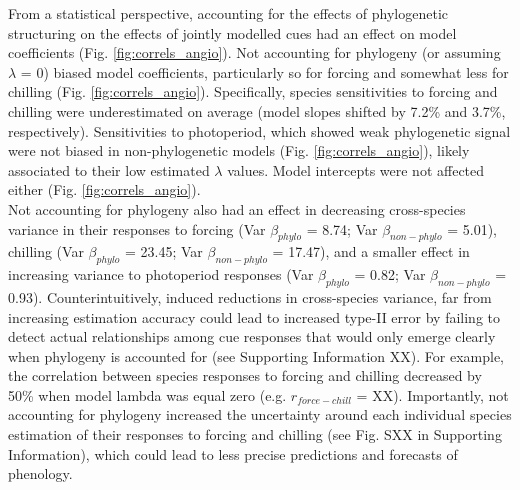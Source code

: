 \documentclass{article}\usepackage[]{graphicx}\usepackage[]{color}
\begin{document}
From a statistical perspective, accounting for the effects of phylogenetic structuring on the effects of jointly modelled cues had an effect on model coefficients (Fig. \ref{fig:correls_angio}). Not accounting for phylogeny (or assuming $\lambda$ = 0) biased model coefficients, particularly so for forcing and somewhat less for chilling (Fig. \ref{fig:correls_angio}). Specifically, species sensitivities to forcing and chilling were underestimated on average (model slopes shifted by 7.2\% and 3.7\%, respectively). Sensitivities to photoperiod, which showed weak phylogenetic signal were not biased in non-phylogenetic models (Fig. \ref{fig:correls_angio}), likely associated to their low estimated $\lambda$ values. Model intercepts were not affected either (Fig. \ref{fig:correls_angio}).\\ 


Not accounting for phylogeny also had an effect in decreasing cross-species variance in their responses to forcing (Var $\beta_{phylo}$ = 8.74; Var $\beta_{non-phylo}$ = 5.01), chilling (Var $\beta_{phylo}$ = 23.45; Var $\beta_{non-phylo}$ = 17.47), and a smaller effect in increasing variance to photoperiod responses (Var $\beta_{phylo}$ = 0.82; Var $\beta_{non-phylo}$ = 0.93). Counterintuitively, induced reductions in cross-species variance, far from increasing estimation accuracy could lead to increased type-II error by failing to detect actual relationships among cue responses that would only emerge clearly when phylogeny is accounted for (see Supporting Information XX). For example, the correlation between species responses to forcing and chilling decreased by 50\% when model lambda was equal zero (e.g. $r_{force-chill}$ = XX). Importantly, not accounting for phylogeny increased the uncertainty around each individual species estimation of their responses to forcing and chilling (see Fig. SXX in Supporting Information), which could lead to less precise predictions and forecasts of phenology.\\

\end{document}
